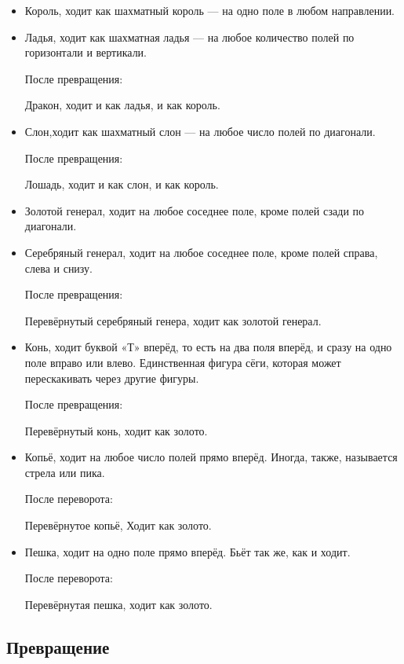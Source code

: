 \begin{itemize}
	\item Король, 
	 ходит как шахматный король — на одно поле в любом направлении.
	 
	\item Ладья, ходит как шахматная ладья — на любое количество полей по горизонтали и 	     вертикали.

	 После превращения:

     Дракон, ходит и как ладья, и как король.

	\item Слон,ходит как шахматный слон — на любое число полей по диагонали.

	 После превращения:

	 Лошадь, ходит и как слон, и как король.

	\item Золотой генерал, ходит на любое соседнее поле, кроме полей сзади по диагонали.

	\item Серебряный генерал, ходит на любое соседнее поле, кроме полей справа, слева и 	 	 снизу.

	 После превращения:

	 Перевёрнутый серебряный генера, ходит как золотой генерал.

	\item Конь, ходит буквой «Т» вперёд, то есть на два поля вперёд, и сразу на одно поле  вправо или влево. Единственная фигура сёги, которая может перескакивать через другие 		 фигуры.

	 После превращения:

     Перевёрнутый конь, ходит как золото.

	\item Копьё, ходит на любое число полей прямо вперёд. Иногда, также, называется стрела 	 или пика.

	 После переворота:

	 Перевёрнутое копьё, Ходит как золото.

    \item Пешка, ходит на одно поле прямо вперёд. Бьёт так же, как и ходит.

	 После переворота:

	 Перевёрнутая пешка, ходит как золото.
	
\end{itemize}

\subsection{Превращение}

